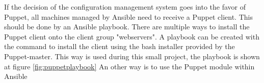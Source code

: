 

If the decision of the configuration management system goes into the favor of Puppet, all machines managed by Ansible need to receive a Puppet client. This should be done by an Ansible playbook. There are multiple ways to install the Puppet client onto the client group "webservers". A playbook can be created with the command to install the client using the bash installer provided by the Puppet-master. This way is used during this small project, the playbook is shown at figure \ref{fig:puppetplaybook} An other way is to use the Puppet module within Ansible \cite{ansiblepuppet}  
